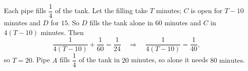 Each pipe fills $\dfrac14$ of the tank. Let the filling take $T$ minutes; $C$ is open for $T-10$ minutes and $D$ for $15$. So $D$ fills the tank alone in $60$ minutes and $C$ in $4(T-10)$ minutes. Then
\[\dfrac{1}{4(T-10)}+\dfrac1{60}=\dfrac1{24}\quad\Longrightarrow\quad\dfrac{1}{4(T-10)}=\dfrac1{40},\]
so $T=20$. Pipe $A$ fills $\dfrac14$ of the tank in $20$ minutes, so alone it needs $\boxed{80\text{ minutes}}$.
